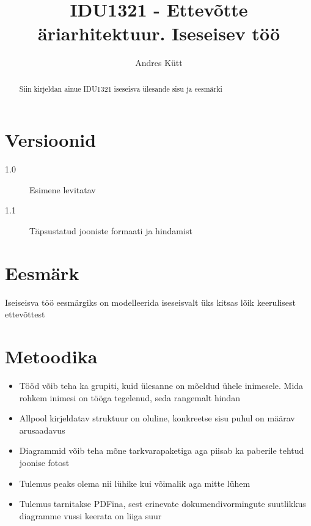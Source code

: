 \documentclass[nobib]{tufte-handout}
\title{IDU1321 - Ettevõtte äriarhitektuur. Iseseisev töö}
\author[Andres Kütt]{Andres Kütt}
\begin{document}
\maketitle
\begin{abstract}
\noindent
Siin kirjeldan ainue IDU1321 iseseisva ülesande sisu ja eesmärki
\end{abstract}

\section{Versioonid}
\begin{description}
	\item[1.0] Esimene levitatav 
	\item[1.1] Täpsustatud jooniste formaati ja hindamist
\end{description}

\section{Eesmärk}
Iseiseisva töö eesmärgiks on modelleerida iseseisvalt üks kitsas lõik keerulisest ettevõttest

\section{Metoodika}
\begin{itemize}
	\item Tööd võib teha ka grupiti, kuid ülesanne on mõeldud ühele inimesele. Mida rohkem inimesi on tööga tegelenud, seda rangemalt hindan
	\item Allpool kirjeldatav struktuur on oluline, konkreetse sisu puhul on määrav arusaadavus
	\item Diagrammid võib teha mõne tarkvarapaketiga aga piisab ka paberile tehtud joonise fotost
	\item Tulemus peaks olema nii lühike kui võimalik aga mitte lühem
	\item Tulemus tarnitakse PDFina, sest erinevate dokumendivormingute suutlikkus diagramme vussi keerata on liiga suur
\end{itemize}
\end{document}
